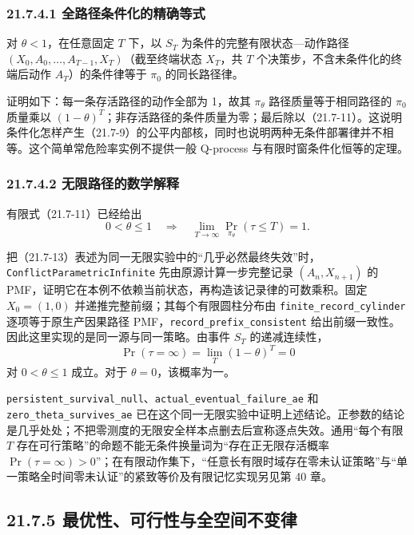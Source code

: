 \documentclass[
  11pt,
  oneside]{book}
\begin{document}
\subsubsection{21.7.4.1 全路径条件化的精确等式}\label{ux5168ux8defux5f84ux6761ux4ef6ux5316ux7684ux7cbeux786eux7b49ux5f0f}

对 \(\theta<1\)，在任意固定 \(T\) 下，以 \(S_T\) 为条件的完整有限状态---动作路径 \((X_0,A_0,\dots,A_{T-1},X_T)\)（截至终端状态 \(X_T\)，共 \(T\) 个决策步，不含未条件化的终端后动作 \(A_T\)）的条件律等于 \(\pi_0\) 的同长路径律。

证明如下：每一条存活路径的动作全部为 1，故其 \(\pi_\theta\) 路径质量等于相同路径的 \(\pi_0\) 质量乘以 \((1-\theta)^T\)；非存活路径的条件质量为零；最后除以（21.7-11）。这说明条件化怎样产生（21.7-9）的公平内部核，同时也说明两种无条件部署律并不相等。这个简单常危险率实例不提供一般 Q-process 与有限时窗条件化恒等的定理。

\subsubsection{21.7.4.2 无限路径的数学解释}\label{ux65e0ux9650ux8defux5f84ux7684ux6570ux5b66ux89e3ux91ca}

有限式（21.7-11）已经给出 \[0<\theta\le1\quad\Longrightarrow\quad
\lim_{T\to\infty}\Pr_{\pi_\theta}(\tau\le T)=1.         \tag{21.7-13}\]

把（21.7-13）表述为同一无限实验中的``几乎必然最终失效''时，\nolinkurl{ConflictParametricInfinite} 先由原源计算一步完整记录 \((A_n,X_{n+1})\) 的 PMF，证明它在本例不依赖当前状态，再构造该记录律的可数乘积。固定 \(X_0=(1,0)\) 并递推完整前缀；其每个有限圆柱分布由 \nolinkurl{finite_record_cylinder} 逐项等于原生产因果路径 PMF，\nolinkurl{record_prefix_consistent} 给出前缀一致性。因此这里实现的是同一源与同一策略。由事件 \(S_T\) 的递减连续性， \[\Pr(\tau=\infty)=\lim_T(1-\theta)^T=0\] 对 \(0<\theta\le1\) 成立。对于 \(\theta=0\)，该概率为一。

\nolinkurl{persistent_survival_null}、\nolinkurl{actual_eventual_failure_ae} 和 \nolinkurl{zero_theta_survives_ae} 已在这个同一无限实验中证明上述结论。正参数的结论是几乎处处；不把零测度的无限安全样本点删去后宣称逐点失效。通用``每个有限 \(T\) 存在可行策略''的命题不能无条件换量词为``存在正无限存活概率 \(\Pr(\tau=\infty)>0\)''；在有限动作集下，``任意长有限时域存在零未认证策略''与``单一策略全时间零未认证''的紧致等价及有限记忆实现另见第 40 章。

\subsection{21.7.5 最优性、可行性与全空间不变律}\label{ux6700ux4f18ux6027ux53efux884cux6027ux4e0eux5168ux7a7aux95f4ux4e0dux53d8ux5f8b}
\end{document}
